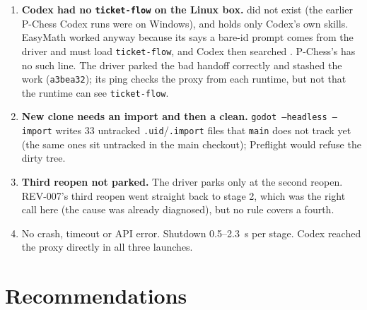 \documentclass[11pt,a4paper]{article}
\begin{document}
\begin{enumerate}
  \item \textbf{Codex had no \texttt{ticket-flow} on the Linux box.}  did not
        exist (the earlier P-Chess Codex runs were on Windows), and  holds
        only Codex's own skills. EasyMath worked anyway because its  says a bare-id
        prompt comes from the driver and must load \texttt{ticket-flow}, and Codex then searched
        . P-Chess's  has no such line. The driver parked the
        bad handoff correctly and stashed the work (\texttt{a3bea32}); its ping checks the proxy
        from each runtime, but not that the runtime can see \texttt{ticket-flow}.
  \item \textbf{New clone needs an import and then a clean.} \texttt{godot --headless --import}
        writes 33 untracked \texttt{.uid}/\texttt{.import} files that \texttt{main} does not track
        yet (the same ones sit untracked in the main checkout); Preflight would refuse the dirty
        tree.
  \item \textbf{Third reopen not parked.} The driver parks only at the second reopen. REV-007's
        third reopen went straight back to stage 2, which was the right call here (the cause was
        already diagnosed), but no rule covers a fourth.
  \item No crash, timeout or API error. Shutdown 0.5--2.3~s per stage. Codex reached the proxy
        directly in all three launches.
\end{enumerate}

\section*{Recommendations}
\end{document}
